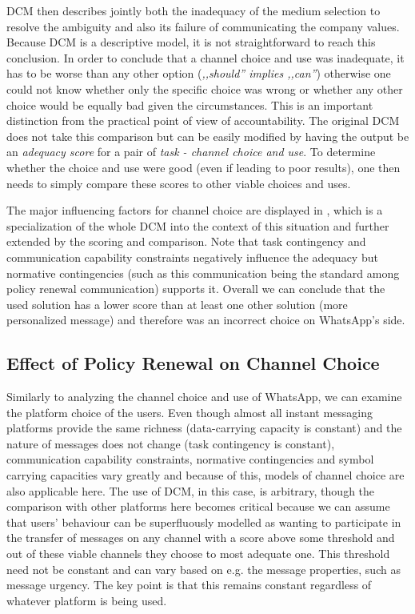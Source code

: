 DCM then describes jointly both the inadequacy of the medium selection to resolve the ambiguity and also its failure of communicating the company values.
Because DCM is a descriptive model, it is not straightforward to reach this conclusion.
In order to conclude that a channel choice and use was inadequate, it has to be worse than any other option (\textit{,,should'' implies ,,can''}) otherwise one could not know whether only the specific choice was wrong or whether any other choice would be equally bad given the circumstances.
This is an important distinction from the practical point of view of accountability.
The original DCM does not take this comparison but can be easily modified by having the output be an \textit{adequacy score} for a pair of \textit{task - channel choice and use}.
To determine whether the choice and use were good (even if leading to poor results), one then needs to simply compare these scores to other viable choices and uses.

The major influencing factors for channel choice are displayed in , which is a specialization of the whole DCM into the context of this situation and further extended by the scoring and comparison.
Note that task contingency and communication capability constraints negatively influence the adequacy but normative contingencies (such as this communication being the standard among policy renewal communication) supports it.
Overall we can conclude that the used solution has a lower score than at least one other solution (more personalized message) and therefore was an incorrect choice on WhatsApp's side.

\subsection{Effect of Policy Renewal on Channel Choice}

Similarly to analyzing the channel choice and use of WhatsApp, we can examine the platform choice of the users.
Even though almost all instant messaging platforms provide the same richness (data-carrying capacity is constant) and the nature of messages does not change (task contingency is constant), communication capability constraints, normative contingencies and symbol carrying capacities vary greatly and because of this, models of channel choice are also applicable here.
The use of DCM, in this case, is arbitrary, though the comparison with other platforms here becomes critical because we can assume that users' behaviour can be superfluously modelled as wanting to participate in the transfer of messages on any channel with a score above some threshold and out of these viable channels they choose to most adequate one.
This threshold need not be constant and can vary based on e.g. the message properties, such as message urgency.
The key point is that this remains constant regardless of whatever platform is being used.


